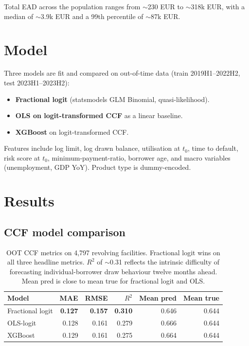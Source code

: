 \documentclass[a4paper,11pt]{article}
\begin{document}
Total EAD across the population ranges from $\sim$230 EUR to
$\sim$318k EUR, with a median of $\sim$3.9k EUR and a 99th percentile
of $\sim$87k EUR.

\section{Model}

Three models are fit and compared on out-of-time data (train
2019H1--2022H2, test 2023H1--2023H2):

\begin{itemize}
  \item \textbf{Fractional logit} (statsmodels GLM Binomial, quasi-likelihood).
  \item \textbf{OLS on logit-transformed CCF} as a linear baseline.
  \item \textbf{XGBoost} on logit-transformed CCF.
\end{itemize}

Features include log limit, log drawn balance, utilisation at $t_0$,
time to default, risk score at $t_0$, minimum-payment-ratio, borrower
age, and macro variables (unemployment, GDP YoY). Product type is
dummy-encoded.

\section{Results}

\subsection{CCF model comparison}

\begin{table}[H]
\centering
\begin{tabular}{l r r r r r}
\toprule
\textbf{Model} & \textbf{MAE} & \textbf{RMSE} & \textbf{$R^2$} & \textbf{Mean pred} & \textbf{Mean true} \\
\midrule
Fractional logit & \textbf{0.127} & \textbf{0.157} & \textbf{0.310} & 0.646 & 0.644 \\
OLS-logit        & 0.128 & 0.161 & 0.279 & 0.666 & 0.644 \\
XGBoost          & 0.129 & 0.161 & 0.275 & 0.664 & 0.644 \\
\bottomrule
\end{tabular}
\caption{OOT CCF metrics on 4{,}797 revolving facilities. Fractional
logit wins on all three headline metrics. $R^2$ of $\sim$0.31
reflects the intrinsic difficulty of forecasting individual-borrower
draw behaviour twelve months ahead. Mean pred is close to mean true
for fractional logit and OLS.}
\end{table}
\end{document}
